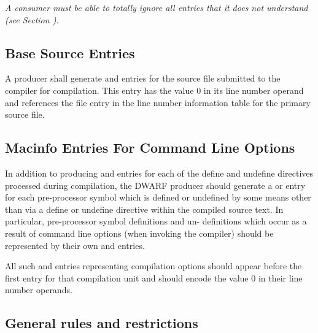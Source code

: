\textit{A consumer must be able to totally ignore all
 entries that it does not understand
(see Section ).}


\subsection{Base Source Entries} 
\label{chap:basesourceentries}

A producer shall generate  and
 entries for the source file submitted to
the compiler for compilation. This  entry
has the value 0 in its line number operand and references
the file entry in the line number information table for the
primary source file.


\subsection{Macinfo Entries For Command Line Options}
\label{chap:macinfoentriesforcommandlineoptions}

In addition to producing  and 
entries for each of the define and undefine directives
processed during compilation, the DWARF producer should
generate a  or  entry for
each pre-processor symbol which is defined or undefined by
some means other than via a define or undefine directive
within the compiled source text. In particular, pre-processor
symbol definitions and un- definitions which occur as a
result of command line options (when invoking the compiler)
should be represented by their own  and
 entries.

All such  and  entries
representing compilation options should appear before the
first  entry for that compilation unit
and should encode the value 0 in their line number operands.


\subsection{General rules and restrictions}
\label{chap:generalrulesandrestrictions}

